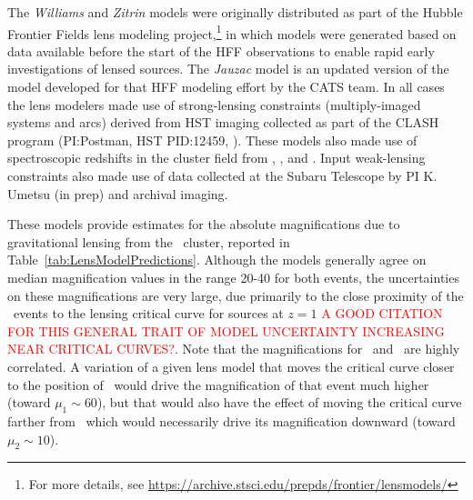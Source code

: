 The {\it Williams} and {\it Zitrin} models were originally distributed
as part of the Hubble Frontier Fields lens modeling
project,\footnote{For more details, see
  \url{https://archive.stsci.edu/prepds/frontier/lensmodels/}} in
which models were generated based on data available before the start
of the HFF observations to enable rapid early investigations of lensed
sources. The {\it Jauzac} model is an updated version of the model
developed for that HFF modeling effort by the CATS team.  In all cases
the lens modelers made use of strong-lensing constraints
(multiply-imaged systems and arcs) derived from HST imaging collected
as part of the CLASH program (PI:Postman, HST PID:12459,
\citealt{Postman:2012}). These models also made use of spectroscopic
redshifts in the cluster field from \citet{Mann:2012},
\citet{Christensen:2012}, and \citet{Grillo:2015a}.  Input weak-lensing
constraints also made use of data collected at the Subaru Telescope by
PI K. Umetsu (in prep) and archival imaging.

These models provide estimates for the absolute magnifications due to gravitational lensing from the \ cluster, reported in Table~\ref{tab:LensModelPredictions}.  Although the models generally agree on median magnification values in the range 20-40 for both events, the uncertainties on these magnifications are very large, due primarily to the close proximity of the \spock\ events to the lensing critical curve for sources at $z=1$ \textcolor{red}{A GOOD CITATION FOR THIS GENERAL TRAIT OF MODEL UNCERTAINTY INCREASING NEAR CRITICAL CURVES?}.  Note that the magnifications for \spockone\ and \spocktwo\ are highly correlated.  A variation of a given lens model that moves the critical curve closer to the position of \spockone\ would drive the magnification of that event much higher (toward $\mu_1\sim60$), but that would also have the effect of moving the critical curve farther from \spocktwo\, which would necessarily drive its magnification downward (toward $\mu_2\sim10$). 

